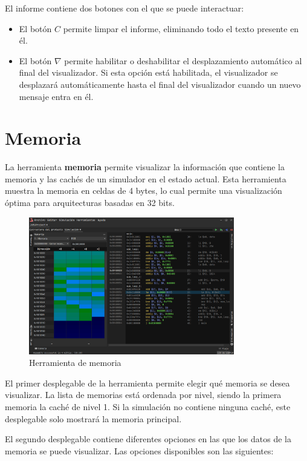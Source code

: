 \noindent El informe contiene dos botones con el que se puede interactuar:
\begin{itemize}
    \item El botón $C$ permite limpar el informe, eliminando todo el
    texto presente en él.
    \item El botón $\nabla$ permite habilitar o deshabilitar el desplazamiento
    automático al final del visualizador.
    Si esta opción está habilitada, el visualizador se desplazará
    automáticamente hasta el final del visualizador cuando un
    nuevo mensaje entra en él.
\end{itemize}


\section{Memoria}\label{sec:memoria-herramienta}

La herramienta \textbf{memoria} permite visualizar la información que
contiene la memoria y las cachés de un simulador en el estado actual.
Esta herramienta muestra la memoria en celdas de 4 bytes,
lo cual permite una visualización óptima para arquitecturas
basadas en 32 bits.

\begin{figure}[H]
    \centering
    \includegraphics[width=0.8\textwidth]{images/tools/jams-memory}
    \caption{Herramienta de memoria}
    \label{fig:jams-memory}
\end{figure}

\noindent El primer desplegable de la herramienta permite elegir qué
memoria se desea visualizar.
La lista de memorias está ordenada por nivel, siendo la primera
memoria la caché de nivel 1.
Si la simulación no contiene ninguna caché,
este desplegable solo mostrará la memoria principal.

\noindent El segundo desplegable contiene diferentes opciones
en las que los datos de la memoria se puede visualizar.
Las opciones disponibles son las siguientes:

